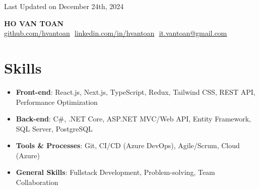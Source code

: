 \documentclass[letterpaper,11pt]{article}
\begin{document}


\begin{flushright}
	\vspace{-4pt}
	\color{gray}
	\item
	Last Updated on December 24th, 2024
\end{flushright}

\vspace{-5pt}

\begin{center}
	\textbf{\Huge\scshape{HO VAN TOAN}}\vspace{8pt} \\
	\small
	\href{https://github.com/hvantoan}{\underline{github.com/hvantoan}} $  $
	\href{https://linkedin.com/in/hvantoan}{\underline{linkedin.com/in/hvantoan}} $  $
	\href{mailto:it.vantoan@gmail.com}
	{\underline{it.vantoan@gmail.com}}
\end{center}

\section{Skills}
\begin{itemize}
  \item \textbf{Front-end}: React.js, Next.js, TypeScript, Redux, Tailwind CSS, REST API, Performance Optimization
  \item \textbf{Back-end}: C\#, .NET Core, ASP.NET MVC/Web API, Entity Framework, SQL Server, PostgreSQL
  \item \textbf{Tools \& Processes}: Git, CI/CD (Azure DevOps), Agile/Scrum, Cloud (Azure)
  \item \textbf{General Skills}: Fullstack Development, Problem-solving, Team Collaboration
\end{itemize}

\end{document}

